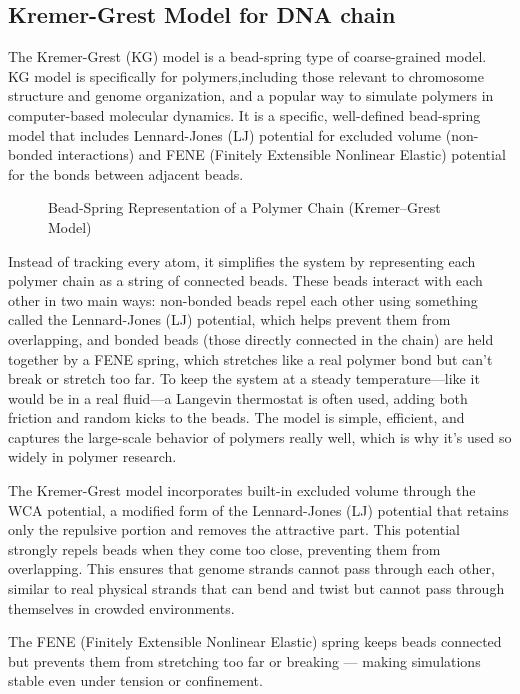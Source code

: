 \documentclass[12pt]{article}
\begin{document}
\begin{flushleft}
\subsection*{Kremer-Grest Model for DNA chain}

	
The Kremer-Grest (KG) model is a bead-spring type of coarse-grained model. KG model is specifically for polymers,including those relevant to chromosome structure and genome organization, and a popular way to simulate polymers in computer-based molecular dynamics. It is a specific, well-defined bead-spring model that includes Lennard-Jones (LJ) potential for excluded volume (non-bonded interactions) and FENE (Finitely Extensible Nonlinear Elastic) potential for the bonds between adjacent beads.	


\begin{figure}[!ht]
  \centering
  \caption{Bead-Spring Representation of a Polymer Chain (Kremer–Grest Model)}
\end{figure}


Instead of tracking every atom, it simplifies the system by representing each polymer chain as a string of connected beads. These beads interact with each other in two main ways: non-bonded beads repel each other using something called the Lennard-Jones (LJ) potential, which helps prevent them from overlapping, and bonded beads (those directly connected in the chain) are held together by a FENE spring, which stretches like a real polymer bond but can't break or stretch too far. To keep the system at a steady temperature—like it would be in a real fluid—a Langevin thermostat is often used, adding both friction and random kicks to the beads. The model is simple, efficient, and captures the large-scale behavior of polymers really well, which is why it's used so widely in polymer research.	



The Kremer-Grest model incorporates built-in excluded volume through the WCA potential, a modified form of the Lennard-Jones (LJ) potential that retains only the repulsive portion and removes the attractive part. This potential strongly repels beads when they come too close, preventing them from overlapping. This ensures that genome strands cannot pass through each other, similar to real physical strands that can bend and twist but cannot pass through themselves in crowded environments.

The FENE (Finitely Extensible Nonlinear Elastic) spring keeps beads connected but prevents them from stretching too far or breaking — making simulations stable even under tension or confinement.
	


\end{flushleft}
\end{document}
